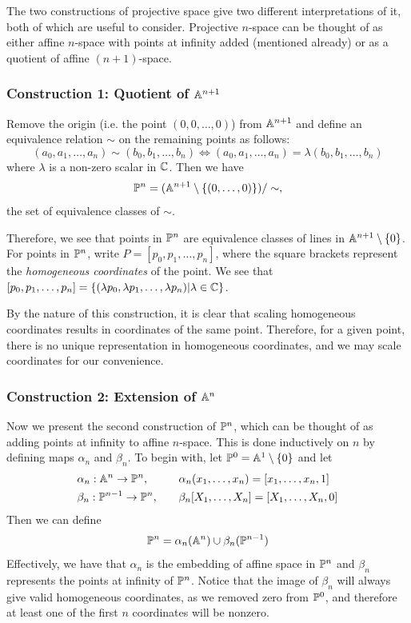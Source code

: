 
The two constructions of projective space give two different interpretations of it, both of which are useful to consider.
Projective $n$-space can be thought of as either affine $n$-space with points at infinity added (mentioned already) or as a quotient of affine $(n+1)$-space.

\subsubsection{Construction 1: Quotient of $\an[n+1]$}
Remove the origin (i.e. the point $(0,0,\ldots,0)$) from $\an[n+1]$ and define an equivalence relation $\sim$ on the remaining points as follows:
$$(a_0,a_1,\ldots,a_n) \sim (b_0,b_1,\ldots,b_n) \iff (a_0,a_1,\ldots,a_n) = \lambda(b_0,b_1,\ldots,b_n)$$
where $\lambda$ is a non-zero scalar in $\C$. Then we have 
$$\pn = (\an[n+1]\setminus\{(0,\ldots,0)\})/\sim,$$
the set of equivalence classes of $\sim$.

Therefore, we see that points in $\pn$ are equivalence classes of lines in $\an[n+1] \setminus \{0\}$.
For points in $\pn$, write $P = [p_0,p_1,\ldots,p_n]$, where the square brackets represent the \emph{homogeneous coordinates} of the point.
We see that $[p_0,p_1,\ldots,p_n] = \{(\lambda p_0, \lambda p_1,\ldots,\lambda p_n) | \lambda \in \C\}$.

By the nature of this construction, it is clear that scaling homogeneous coordinates results in coordinates of the same point.
Therefore, for a given point, there is no unique representation in homogeneous coordinates, and we may scale coordinates for our convenience.

\subsubsection{Construction 2: Extension of $\an[n]$}
Now we present the second construction of $\pn$, which can be thought of as adding points at infinity to affine $n$-space.
This is done inductively on $n$ by defining maps $\alpha_n$ and $\beta_n$.
To begin with, let $\pn[0] = \an[1] \setminus \{0\}$ and let
\begin{alignat*}{2}
&\alpha_n : \an \rightarrow \pn,\quad &&\alpha_n(x_1,\ldots,x_n) = [x_1,\ldots,x_n,1]\\
 &\beta_n : \pn[n-1] \rightarrow \pn,\quad &&\beta_n[X_1,\ldots,X_n] = [X_1,\ldots,X_n,0]
\end{alignat*}
Then we can define
$$\pn = \alpha_n(\an) \cup \beta_n(\pn[n-1])$$
Effectively, we have that $\alpha_n$ is the embedding of affine space in $\pn$ and $\beta_n$ represents the points at infinity of $\pn$.
Notice that the image of $\beta_n$ will always give valid homogeneous coordinates, as we removed zero from $\pn[0]$, and therefore at least one of the first $n$ coordinates will be nonzero.
